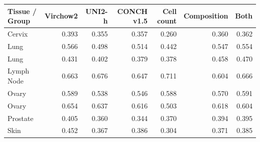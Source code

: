 \begin{tabular}{lrrrrrr}
\toprule
Tissue / Group & Virchow2 & UNI2-h & CONCH v1.5 & Cell count & Composition & Both \\
\midrule
Cervix & 0.393 & 0.355 & 0.357 & 0.260 & 0.360 & 0.362 \\
Lung & 0.566 & 0.498 & 0.514 & 0.442 & 0.547 & 0.554 \\
Lung & 0.431 & 0.402 & 0.379 & 0.378 & 0.458 & 0.470 \\
Lymph Node & 0.663 & 0.676 & 0.647 & 0.711 & 0.604 & 0.666 \\
Ovary & 0.589 & 0.538 & 0.546 & 0.588 & 0.570 & 0.591 \\
Ovary & 0.654 & 0.637 & 0.616 & 0.503 & 0.618 & 0.604 \\
Prostate & 0.405 & 0.360 & 0.344 & 0.370 & 0.394 & 0.395 \\
Skin & 0.452 & 0.367 & 0.386 & 0.304 & 0.371 & 0.385 \\
\bottomrule
\end{tabular}
